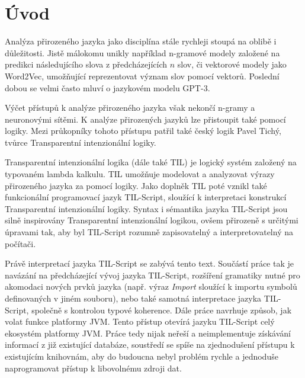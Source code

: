 \chapter{Úvod}
\label{sec:Introduction}

Analýza přirozeného jazyka jako disciplína stále rychleji stoupá na oblibě i důležitosti. Jistě
málokomu unikly například n-gramové\cite{ngram-models} modely založené na predikci následujícího
slova z předcházejících $n$ slov, či vektorové modely jako Word2Vec\cite{word2vec}, umožňující
reprezentovat význam slov pomocí vektorů. Poslední dobou se velmi často mluví o jazykovém modelu
GPT-3\cite{gpt3}.

Výčet přístupů k analýze přirozeného jazyka však nekončí n-gramy a neuronovými sítěmi. K analýze
přirozených jazyků lze přistoupit také pomocí logiky. Mezi průkopníky tohoto přístupu patřil také
český logik Pavel Tichý, tvůrce Transparentní intenzionální logiky.

Transparentní intenzionální logika (dále také TIL) je logický systém založený na typovaném lambda
kalkulu\cite{til-duzi}. TIL umožňuje modelovat a analyzovat výrazy přirozeného jazyka za pomocí
logiky. Jako doplněk TIL poté vznikl také funkcionální programovací jazyk
TIL-Script\cite{til-script}, sloužící k interpretaci konstrukcí Transparentní intenzionální logiky.
Syntax i sémantika jazyka TIL-Script jsou silně inspirovány Transparentní intenzionální logikou,
ovšem přirozeně s určitými úpravami tak, aby byl TIL-Script rozumně zapisovatelný a
interpretovatelný na počítači.

Právě interpretací jazyka TIL-Script se zabývá tento text. Součástí práce tak je navázání
na předcházející vývoj jazyka TIL-Script, rozšíření gramatiky nutné pro akomodaci nových
prvků jazyka (např. výraz \textit{Import} sloužící k importu symbolů definovaných v jiném
souboru), nebo také samotná interpretace jazyka TIL-Script, společně s kontrolou typové koherence.
Dále práce navrhuje způsob, jak volat funkce platformy JVM. Tento přístup otevírá jazyku TIL-Script
celý ekosystém platformy JVM. Práce tedy nijak neřeší a neimplementuje získávání informací
z již existující databáze, soustředí se spíše na zjednodušení přístupu k existujícím knihovnám, aby
do budoucna nebyl problém rychle a jednoduše naprogramovat přístup k libovolnému zdroji dat.

